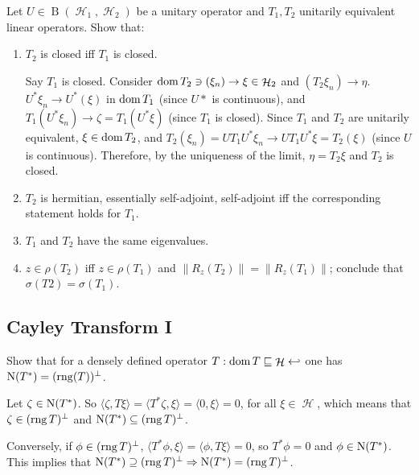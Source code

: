 \documentclass{article}
\theoremstyle{exercisestyle}
\newenvironment{exercise}[1]
  {\renewcommand\theinnerex{#1}\innerex}
  {\endinnerex}
\DeclareMathOperator{\bounded}{B}
\DeclareMathOperator{\hilbert}{\mathcal{H}}
\newcommand{\norm}[1]{\lVert #1 \rVert}
\newcommand{\inner}[2]{\langle #1, #2 \rangle}
\begin{document}
\begin{exercise}{2.1.26}
    Let $U \in \bounded(\hilbert_1, \hilbert_2)$ be a unitary operator and $T_1, T_2$ unitarily equivalent linear operators. Show that:
    \begin{enumerate}
        \item $T_2$ is closed iff $T_1$ is closed.


              Say $T_1$ is closed. Consider $\dom T_2 \ni(\xi_n) \to \xi \in \hilbert_2$  and $(T_2 \xi_n) \to \eta$. $U^*\xi_n \to U^*(\xi)$ in $\operatorname{dom} T_1$ (since $U*$ is continuous), 
              and $T_1(U^*\xi_n) \to \zeta = T_1(U^* \xi) $ (since $T_1$ is closed). Since $T_1$ and $T_2$ are unitarily equivalent, $\xi \in \operatorname{dom} T_2$, and 
              $T_2 (\xi_n) = U T_1 U^* \xi_n \to U T_1 U^* \xi = T_2 (\xi)$ (since $U$ is continuous). Therefore, by the uniqueness of the limit, $\eta = T_2 \xi$
              and $T_2$ is closed.


        \item $T_2$ is hermitian, essentially self-adjoint, self-adjoint iff the corresponding statement holds for $T_1$.
        \item $T_1$ and $T_2$ have the same eigenvalues.
        \item $z \in \rho(T_2)$ iff $z \in \rho(T_1)$ and $\norm{R_z(T_2)} = \norm{R_z (T_1)}$; conclude that $\sigma(T2) = \sigma(T_1)$.
    \end{enumerate}


\end{exercise}

\subsection{Cayley Transform I}

\begin{exercise}{2.2.2}
    Show that for a densely defined operator $T : \dom T \sqsubseteq \hilbert \hookleftarrow$ one has $\operatorname{N}(T^*) = (\operatorname{rng} (T))^\perp$.

    Let $\zeta \in \operatorname{N} (T^*)$. So $\inner{\zeta}{T \xi} = \inner{T^* \zeta}{\xi} = \inner{0}{\xi} = 0$, for all $\xi \in \hilbert$,
    which means that $\zeta \in (\operatorname{rng} T)^\perp$ and $\operatorname{N} (T^*) \subseteq (\operatorname{rng} T)^\perp$.

    Conversely, if $\phi \in (\operatorname{rng} T)^\perp$,
    $ \inner{T^* \phi}{\xi} = \inner{\phi}{T\xi} = 0$, so $T^*\phi = 0$ and $\phi \in \operatorname{N} (T^*)$.
    This implies that $\operatorname{N} (T^*) \supseteq (\operatorname{rng} T)^\perp \Rightarrow \operatorname{N} (T^*) = (\operatorname{rng} T)^\perp$.


\end{exercise}
\end{document}
